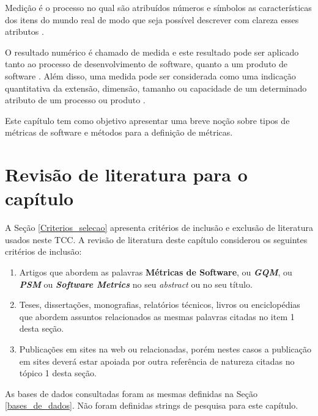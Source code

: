 Medição é o processo no qual são atribuídos números e símbolos as características dos itens do mundo real de modo que seja possível descrever com clareza esses atributos \cite[p.~5]{Fenton}.

O resultado numérico é chamado de medida e este resultado pode ser aplicado tanto ao processo de desenvolvimento de software, quanto a um produto de software \cite{sollingen}. Além disso, uma medida pode ser considerada como uma indicação quantitativa da extensão, dimensão, tamanho ou capacidade de um determinado atributo de um processo ou produto \cite[p.~81]{pressman}.

Este capítulo tem como objetivo apresentar uma breve noção sobre tipos de métricas de software e métodos para a definição de métricas.

\section {Revisão de literatura para o capítulo}

A Seção \ref{Criterios_selecao} apresenta critérios de inclusão e exclusão de literatura usados neste TCC. A revisão de literatura deste capítulo considerou os seguintes critérios de inclusão:

\begin{enumerate}

\item Artigos que abordem as palavras \textbf{Métricas de Software}, ou \textbf{\textit{GQM}}, ou \textbf{\textit{PSM}} ou \textbf{\textit{Software Metrics}} no seu \textit{abstract} ou no seu título.

\item Teses, dissertações, monografias, relatórios técnicos, livros ou enciclopédias que abordem assuntos relacionados as mesmas palavras citadas no item 1 desta seção.

\item Publicações em sites na web ou relacionadas,  porém nestes casos a publicação em sites deverá estar apoiada por outra referência de natureza citadas no tópico 1 desta seção.

\end{enumerate}

As bases de dados consultadas foram as mesmas definidas na Seção \ref{bases_de_dados}. Não foram definidas strings de pesquisa para este capítulo.



